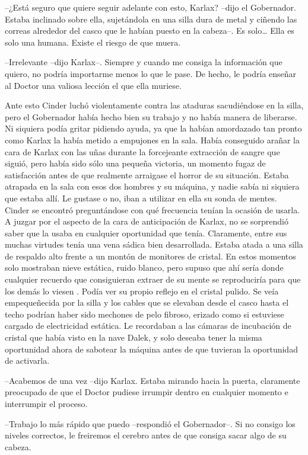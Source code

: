 --¿Está seguro que quiere seguir adelante con esto, Karlax? --dijo el Gobernador. Estaba inclinado sobre ella, sujetándola en una silla dura de metal y ciñendo las correas alrededor del casco que le habían puesto en la cabeza--. Es solo… Ella es solo una humana. Existe el riesgo de que muera. 

--Irrelevante --dijo Karlax--. Siempre y cuando me consiga la información que quiero, no podría importarme menos lo que le pase. De hecho, le podría enseñar al Doctor una valiosa lección el que ella muriese. 

Ante esto Cinder luchó violentamente contra las ataduras sacudiéndose en la silla, pero el Gobernador había hecho bien su trabajo y no había manera de liberarse. Ni siquiera podía gritar pidiendo ayuda, ya que la habían amordazado tan pronto como Karlax la había metido a empujones en la sala. 
Había conseguido arañar la cara de Karlax con las uñas durante la forcejeante extracción de sangre que siguió, pero había sido sólo una pequeña victoria, un momento fugaz de satisfacción antes de que realmente arraigase el horror de su situación. Estaba atrapada en la sala con esos dos hombres y su máquina, y nadie sabía ni siquiera que estaba allí. Le gustase o no, iban a utilizar en ella su sonda de mentes. 
Cinder se encontró preguntándose con qué frecuencia tenían la ocasión de usarla. A juzgar por el aspecto de la cara de anticipación de Karlax, no se sorprendió saber que la usaba en cualquier oportunidad que tenía. Claramente, entre sus muchas virtudes tenía una vena sádica bien desarrollada. 
Estaba atada a una silla de respaldo alto frente a un montón de monitores de cristal. En estos momentos solo mostraban nieve estática, ruido blanco, pero supuso que ahí sería donde cualquier recuerdo que consiguieran extraer de su mente se reproduciría para que los demás lo viesen . 
Podía ver su propio reflejo en el cristal pulido. Se veía empequeñecida por la silla y los cables que se elevaban desde el casco hasta el techo podrían haber sido mechones de pelo fibroso, erizado como si estuviese cargado de electricidad estática. 
Le recordaban a las cámaras de incubación de cristal que había visto en la nave Dalek, y solo deseaba tener la misma oportunidad ahora de sabotear la máquina antes de que tuvieran la oportunidad de activarla. 

--Acabemos de una vez --dijo Karlax. Estaba mirando hacia la puerta, claramente preocupado de que el Doctor pudiese irrumpir dentro en cualquier momento e interrumpir el proceso. 

--Trabajo lo más rápido que puedo --respondió el Gobernador--. Si no consigo los niveles correctos, le freiremos el cerebro antes de que consiga sacar algo de su cabeza. 

